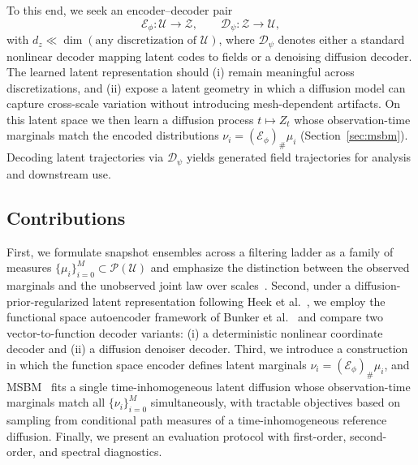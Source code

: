 \documentclass[review,onefignum,onetabnum]{siamart250211}
\newcommand{\1}{\mathbf{1}}
\newcommand{\cU}{\mathcal{U}}
\newcommand{\cZ}{\mathcal{Z}}
\newcommand{\cP}{\mathcal{P}}
\newcommand{\cE}{\mathcal{E}}
\newcommand{\cD}{\mathcal{D}}
\begin{document}
To this end, we seek an encoder--decoder pair
\begin{equation}
\cE_\phi:\cU\to\cZ,\qquad \cD_\psi:\cZ\to\cU,
\label{eq:fae_maps_intro}
\end{equation}
with $d_z\ll \dim(\text{any discretization of }\cU)$, where $\cD_\psi$ denotes either a standard nonlinear decoder mapping latent codes to fields or a denoising diffusion decoder. The learned latent representation should (i) remain meaningful across discretizations, and (ii) expose a latent geometry in which a diffusion model can capture cross-scale variation without introducing mesh-dependent artifacts. On this latent space we then learn a diffusion process $t\mapsto Z_t$ whose observation-time marginals match the encoded distributions $\nu_i=(\cE_\phi)_\#\mu_i$ (Section~\ref{sec:msbm}). Decoding latent trajectories via $\cD_\psi$ yields generated field trajectories for analysis and downstream use.

\subsection{Contributions}
First, we formulate snapshot ensembles across a filtering ladder as a family of measures $\{\mu_i\}_{i=0}^M\subset\cP(\cU)$ and emphasize the distinction between the observed marginals and the unobserved joint law over scales~\cite{tran2016stochastic}. Second, under a diffusion-prior-regularized latent representation following Heek et al.~\cite{heek2026ul}, we employ the functional space autoencoder framework of Bunker et al.~\cite{bunker2025fae} and compare two vector-to-function decoder variants: (i) a deterministic nonlinear coordinate decoder and (ii) a diffusion denoiser decoder. Third, we introduce a construction in which the function space encoder defines latent marginals $\nu_i=(\cE_\phi)_\#\mu_i$, and \textsc{MSBM}~\cite{park2025msbm} fits a single time-inhomogeneous latent diffusion whose observation-time marginals match all $\{\nu_i\}_{i=0}^M$ simultaneously, with tractable objectives based on sampling from conditional path measures of a time-inhomogeneous reference diffusion. Finally, we present an evaluation protocol with first-order, second-order, and spectral diagnostics.
\end{document}
